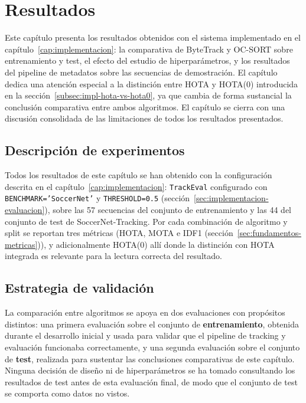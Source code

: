 \chapter{Resultados}
\label{cap:pruebas}

Este capítulo presenta los resultados obtenidos con el sistema implementado
en el capítulo~\ref{cap:implementacion}: la comparativa de ByteTrack y
OC-SORT sobre entrenamiento y test, el efecto del estudio de
hiperparámetros, y los resultados del pipeline de metadatos sobre las secuencias de
demostración. El capítulo dedica una atención especial a la distinción
entre HOTA y HOTA(0) introducida en la
sección~\ref{subsec:impl-hota-vs-hota0}, ya que cambia de forma sustancial la conclusión comparativa entre
ambos algoritmos. El capítulo se cierra con una discusión
consolidada de las limitaciones de todos los resultados presentados.

\section{Descripción de experimentos}
\label{sec:pruebas-config}

Todos los resultados de este capítulo se han obtenido con la configuración
descrita en el capítulo~\ref{cap:implementacion}: \texttt{TrackEval}
configurado con \texttt{BENCHMARK='SoccerNet'} y
\texttt{THRESHOLD=0.5} (sección~\ref{sec:implementacion-evaluacion}),
sobre las 57 secuencias del conjunto de entrenamiento y las 44 del
conjunto de test de SoccerNet-Tracking. Por cada
combinación de algoritmo y split se reportan tres métricas
(HOTA, MOTA e IDF1 (sección~\ref{sec:fundamentos-metricas})),
y
adicionalmente HOTA(0) allí donde la distinción con HOTA integrada es
relevante para la lectura correcta del resultado.

\section{Estrategia de validación}
\label{sec:pruebas-estrategia}

La comparación entre algoritmos se apoya en dos evaluaciones con propósitos
distintos: una
primera evaluación sobre el conjunto de \textbf{entrenamiento}, obtenida
durante el desarrollo inicial y usada para validar que el pipeline de
tracking y evaluación funcionaba correctamente, y una
segunda evaluación sobre el conjunto de \textbf{test}, realizada para
sustentar las conclusiones comparativas de este capítulo.
Ninguna decisión de diseño ni de hiperparámetros se ha tomado consultando
los resultados de test antes de esta evaluación final, de modo que el
conjunto de test se comporta como datos no vistos.

